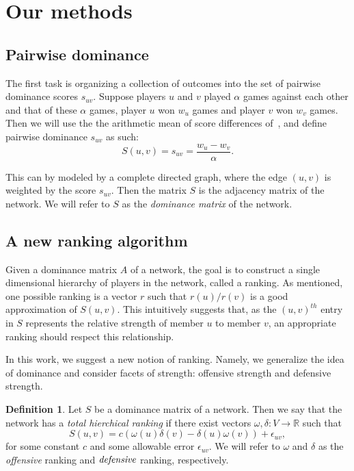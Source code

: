 \documentclass[a4,11pt,twoside,leqno]{report}
\theoremstyle{definition}
\newtheorem{defn}[thm]{Definition}
\theoremstyle{remark}
\numberwithin{equation}{section}
\newcommand{\R}{\mathbb{R}}
\begin{document}
\section{Our methods}\label{sec:methods}

\subsection{Pairwise dominance}
The first task is organizing a collection of outcomes into the set of pairwise
dominance scores $s_{uv}$.  Suppose players $u$ and $v$  played $\alpha$ games
against each other and that of these $\alpha$ games, player $u$ won $w_u$ games
and player $v$ won $w_v$ games.  Then we will use the the arithmetic mean of
score differences of~\cite{jiang:statistical:mp10}, and define pairwise
dominance $s_{uv}$ as such:
\begin{equation}\label{eq:suv}
S(u,v) = s_{uv} = \frac{w_u - w_v}{\alpha}.
\end{equation}

This can by modeled by a complete directed graph, where the edge $(u,v)$ is
weighted by the score $s_{uv}$.  Then the matrix $S$ is the adjacency matrix of
the network.  We will refer to $S$ as the \emph{dominance matrix} of the
network.

\subsection{A new ranking algorithm}
Given a dominance matrix $A$ of a network, the goal is to construct a single
dimensional hierarchy of players in the network, called a ranking.  As
mentioned, one possible ranking is a vector $r$ such that $r(u)/r(v)$ is a good
approximation of $S(u,v)$.  This intuitively suggests that, as the $(u,v)^{th}$
entry in $S$ represents the relative strength of member $u$ to member $v$, an
appropriate ranking should respect this relationship.

In this work, we suggest a new notion of ranking.  Namely, we generalize the
idea of dominance and consider facets of strength: offensive strength and
defensive strength.

\begin{defn}
Let $S$ be a dominance matrix of a network.  Then we say that the network has a
\emph{total hierchical ranking} if there exist vectors $\omega, \delta: V
\rightarrow \R$ such that
\begin{equation}\label{eq:offdef}
S(u,v) = c(\omega(u)\delta(v) - \delta(u)\omega(v)) + \epsilon_{uv},
\end{equation}
for some constant $c$ and some allowable error $\epsilon_{uv}$.  We will refer
to $\omega$ and $\delta$ as the \emph{offensive} ranking and $\emph{defensive}$
ranking, respectively.
\end{defn}
\end{document}
